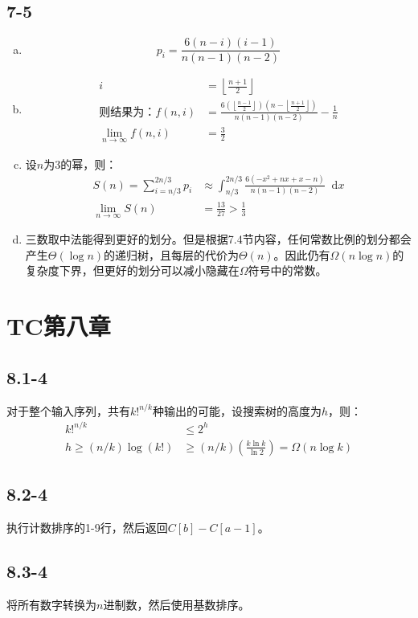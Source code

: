 \documentclass{article}
\newcommand*{\dif}{\mathop{}\!\mathrm{d}}
\begin{document}
	\subsection*{7-5}
	\begin{enumerate}[a.]
		\item 
		$$p_i=\frac{6(n-i)(i-1)}{n(n-1)(n-2)}$$
		\item 
		\[
		\begin{aligned}
			i&=\left\lfloor\frac{n+1}{2}\right\rfloor\\
			\text{则结果为：}f(n,i)&=\frac{6\left(\left\lfloor\frac{n-1}{2}\right\rfloor\right)\left(n-\left\lfloor\frac{n+1}{2}\right\rfloor\right)}{n(n-1)(n-2)}-\frac{1}{n}\\
			\lim\limits_{n\rightarrow \infty}f(n,i)&=\frac{3}{2}
		\end{aligned}
		\]
		\item 设$n$为3的幂，则：
		\[
		\begin{aligned}
		S(n)=\sum_{i=n/3}^{2n/3}p_i&\approx \int_{n/3}^{2n/3}\frac{6(-x^2+nx+x-n)}{n(n-1)(n-2)}\dif x\\
		\lim\limits_{n\rightarrow \infty}S(n)&=\frac{13}{27}>\frac{1}{3}
		\end{aligned}
		\]
		\item 三数取中法能得到更好的划分。但是根据7.4节内容，任何常数比例的划分都会产生$\Theta(\log n)$的递归树，且每层的代价为$\Theta(n)$。因此仍有$\Omega(n\log n)$的复杂度下界，但更好的划分可以减小隐藏在$\Omega$符号中的常数。
		\end{enumerate}
		\section*{TC第八章}
		\subsection*{8.1-4}
		对于整个输入序列，共有$k!^{n/k}$种输出的可能，设搜索树的高度为$h$，则：
		\[
		\begin{aligned}
			k!^{n/k}&\le 2^h\\
			h\ge (n/k)\log (k!)&\ge(n/k)\left(\frac{k\ln k}{\ln 2}\right)=\Omega(n\log k) 
		\end{aligned}
		\]
	\subsection*{8.2-4}
	执行计数排序的1-9行，然后返回$C[b]-C[a-1]$。
	\subsection*{8.3-4}
	将所有数字转换为$n$进制数，然后使用基数排序。
\end{document}
